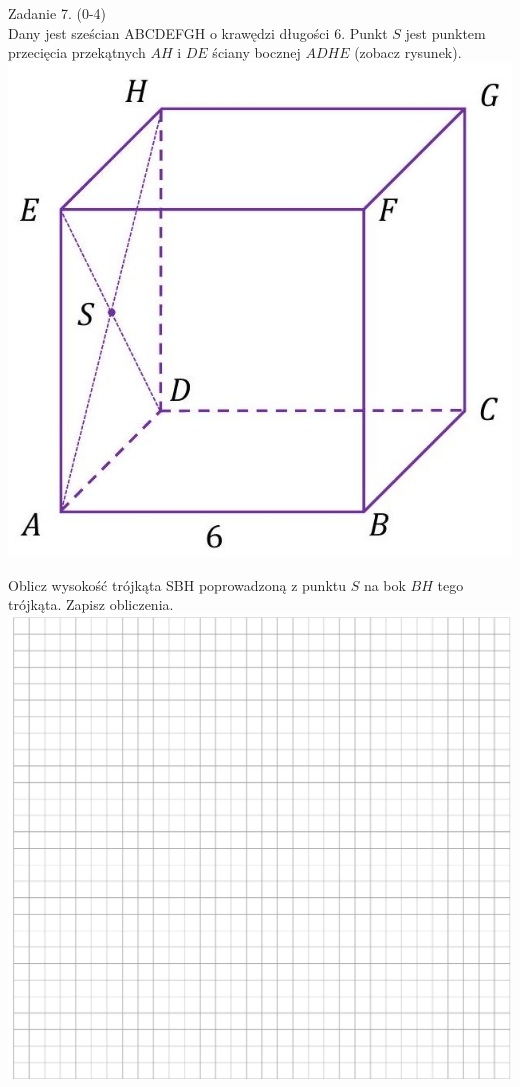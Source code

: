 \documentclass[10pt]{article}
\begin{document}
Zadanie 7. (0-4)\\
Dany jest sześcian ABCDEFGH o krawędzi długości 6. Punkt \(S\) jest punktem przecięcia przekątnych \(A H\) i \(D E\) ściany bocznej \(A D H E\) (zobacz rysunek).\\
\includegraphics[max width=\textwidth, center]{2024_11_21_f1ecc00f5c4ab21f0d04g-11}

Oblicz wysokość trójkąta SBH poprowadzoną z punktu \(S\) na bok \(B H\) tego trójkąta. Zapisz obliczenia.\\
\includegraphics[max width=\textwidth, center]{2024_11_21_f1ecc00f5c4ab21f0d04g-11(1)}
\end{document}
